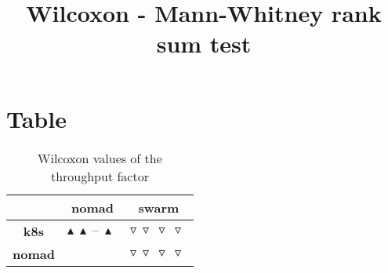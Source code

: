 \documentclass{article}
\title{Wilcoxon - Mann-Whitney rank sum test}
\author{}
\begin{document}
\maketitle
\section{Table}
\begin{table}[!htp]
  \caption{Wilcoxon values of the throughput factor}
  \label{table:throughput}
  \centering
  \begin{scriptsize}
  \begin{tabular}{c|cc}
      & \textbf{nomad} & \textbf{swarm} \\\hline
      \textbf{k8s} & $\blacktriangle\ \blacktriangle\ \text{--}\ \blacktriangle\  $ & $ \triangledown\ \triangledown\ \triangledown\ \triangledown\ $ \\
      \textbf{nomad} & $ $ & $ \triangledown\ \triangledown\ \triangledown\ \triangledown\ $ \\
  \end{tabular}
  \end{scriptsize}
\end{table}
\end{document}
